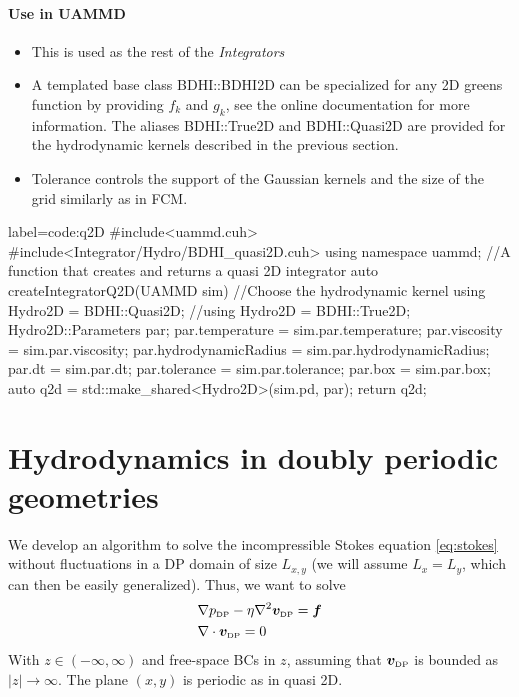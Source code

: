 \documentclass[ twoside,openright,titlepage,numbers=noenddot,%
headinclude,footinclude,cleardoublepage=empty,abstract=on,
BCOR=5mm,paper=a4,fontsize=11pt, dvipsnames
]{scrreprt}
\renewcommand{\vec}[1]{\bm{#1}}
\newcommand{\fvel}{v}
\newcommand{\dpr}{\text{\tiny DP}}
\begin{document}
\subsubsection*{Use in UAMMD}
\begin{itemize}
\item This is used as the rest of the \emph{Integrators}
\item A templated base class BDHI::BDHI2D can be specialized for any 2D greens function by providing $f_k$ and $g_k$, see the online documentation for more information. The aliases BDHI::True2D and BDHI::Quasi2D are provided for the hydrodynamic kernels described in the previous section.
\item Tolerance controls the support of the Gaussian kernels and the size of the grid similarly as in \gls{FCM}.
\end{itemize}
\begin{code2}{label=code:q2D}
#include<uammd.cuh>
#include<Integrator/Hydro/BDHI_quasi2D.cuh>
using namespace uammd;
//A function that creates and returns a quasi 2D integrator
auto createIntegratorQ2D(UAMMD sim){
  //Choose the hydrodynamic kernel
  using Hydro2D = BDHI::Quasi2D;
  //using Hydro2D = BDHI::True2D;
  Hydro2D::Parameters par;
  par.temperature = sim.par.temperature;
  par.viscosity = sim.par.viscosity;
  par.hydrodynamicRadius = sim.par.hydrodynamicRadius;
  par.dt = sim.par.dt;
  par.tolerance = sim.par.tolerance;
  par.box = sim.par.box;
  auto q2d = std::make_shared<Hydro2D>(sim.pd, par);
  return q2d;
}
\end{code2}

\newpage

\chapter{Hydrodynamics in doubly periodic geometries}\label{sec:dpstokes}
We develop an algorithm to solve the incompressible Stokes equation \eqref{eq:stokes} without fluctuations in a \gls{DP} domain of size $L_{x,y}$ (we will assume $L_x=L_y$, which can then be easily generalized). Thus, we want to solve
\begin{equation}
  \label{eq:dpstokes}
  \begin{aligned}
    &\nabla p_{\dpr} - \eta\nabla^2\vec{\fvel}_{\dpr} = \vec{f}\\
    &\nabla\cdot\vec{\fvel}_{\dpr} = 0
\end{aligned}
\end{equation}
With $z\in(-\infty, \infty)$ and free-space \glspl{BC} in $z$, assuming that $\vec{\fvel}_{\dpr}$ is bounded as $|z|\rightarrow\infty$. The plane $(x,y)$ is periodic as in quasi 2D.
\end{document}
